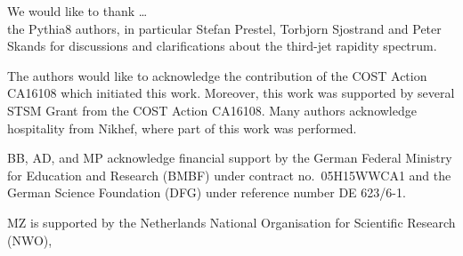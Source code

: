 We would like to thank \ldots \\
the {\sc Pythia8} authors, in particular Stefan Prestel, Torbjorn Sjostrand and Peter Skands for 
discussions and clarifications about the third-jet rapidity spectrum. 

The authors would like to acknowledge the contribution of the COST Action CA16108 which initiated this work.
Moreover, this work was supported by several STSM Grant from the COST Action CA16108. Many authors acknowledge
hospitality from Nikhef, where part of this work was performed.

BB, AD, and MP acknowledge financial support by the
German Federal Ministry for Education and Research (BMBF) under
contract no.~05H15WWCA1 and the German Science Foundation (DFG) under
reference number DE 623/6-1.

MZ is supported
 by the Netherlands National Organisation for Scientific
 Research (NWO),

